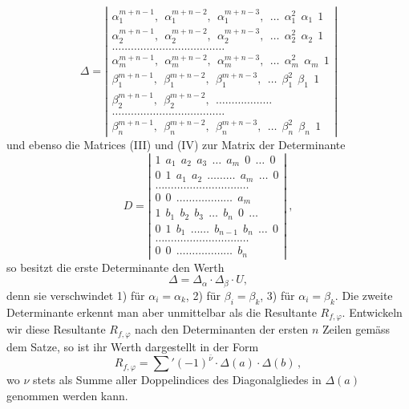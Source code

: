 \documentclass[11pt]{article}
\providecommand{\gesperrt}[1]{\textls[130]{#1}}
\let\Delta\varDelta
\begin{document}
\[
\Delta =
\left|\begin{array}{l}
\alpha_1^{m+n-1},\ \ \alpha_1^{m+n-2},\ \ \alpha_1^{m+n-3},\ \ \ldots\ \ \alpha_1^{2}\ \ \alpha_1\ \ 1\\
\alpha_2^{m+n-1},\ \ \alpha_2^{m+n-2},\ \ \alpha_2^{m+n-3},\ \ \ldots\ \ \alpha_2^{2}\ \ \alpha_2\ \ 1\\
\ldots\ldots\ldots\ldots\ldots\ldots\ldots\ldots\ldots\ldots\ldots\ldots\\
\alpha_m^{m+n-1},\ \ \alpha_m^{m+n-2},\ \ \alpha_m^{m+n-3},\ \ \ldots\ \ \alpha_m^{2}\ \ \alpha_m\ \ 1\\
\beta_1^{m+n-1},\ \ \beta_1^{m+n-2},\ \ \beta_1^{m+n-3},\ \ \ldots\ \ \beta_1^{2}\ \ \beta_1\ \ 1\\
\beta_2^{m+n-1},\ \ \beta_2^{m+n-2},\ \ \ldots\ldots\ldots\ldots\ldots\ldots\\
\ldots\ldots\ldots\ldots\ldots\ldots\ldots\ldots\ldots\ldots\ldots\ldots\\
\beta_n^{m+n-1},\ \ \beta_n^{m+n-2},\ \ \beta_n^{m+n-3},\ \ \ldots\ \ \beta_n^{2}\ \ \beta_n\ \ 1
\end{array}\right|
\]
und ebenso die Matrices (III) und (IV) zur Matrix der Determinante
\[
D =
\left|\begin{array}{l}
1\ \ a_1\ \ a_2\ \ a_3\ \ \ldots\ \ a_m\ \ 0\ \ \ldots\ \ 0\\
0\ \ 1\ \ a_1\ \ a_2\ \ \ldots\ldots\ldots\ \ a_m\ \ \ldots\ \ 0\\
\ldots\ldots\ldots\ldots\ldots\ldots\ldots\ldots\ldots\ldots\\
0\ \ 0\ \ \ldots\ldots\ldots\ldots\ldots\ldots\ \ a_m\\
1\ \ b_1\ \ b_2\ \ b_3\ \ \ldots\ \ b_n\ \ 0\ \ \ldots\\
0\ \ 1\ \ b_1\ \ \ldots\ldots\ \ b_{n-1}\ \ b_n\ \ \ldots\ \ 0\\
\ldots\ldots\ldots\ldots\ldots\ldots\ldots\ldots\ldots\ldots\\
0\ \ 0\ \ \ldots\ldots\ldots\ldots\ldots\ldots\ \ b_n
\end{array}\right|\ ,
\]
so besitzt die erste Determinante den Werth
\[
\Delta = \Delta_\alpha\cdot\Delta_\beta\cdot U,
\]
denn sie verschwindet 1) für $\alpha_i=\alpha_k$, 2) für $\beta_i=\beta_k$, 3) für $\alpha_i=\beta_k$.
Die zweite Determinante erkennt man aber unmittelbar als die Resultante $R_{f,\varphi}$. Entwickeln wir diese Resultante $R_{f,\varphi}$ nach den
Determinanten der ersten $n$ Zeilen gemäss dem \gesperrt{Laplace'schen}
Satze, so ist ihr Werth dargestellt in der Form
\[
R_{f,\varphi} = \sum{}'(-1)^{\bar\nu}\cdot\Delta(a)\cdot\Delta(b)\,,
\]
wo $\nu$ stets als Summe aller Doppelindices des Diagonalgliedes in
$\Delta(a)$ genommen werden kann.
\end{document}
